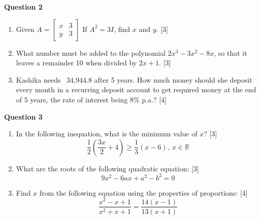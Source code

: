 \newpage
\noindent
\textbf{Question 2}\\
\begin{enumerate}[label=(\roman*)]

    \item Given $A = \begin{bmatrix*}  x & 3  \\  y & 3  \end{bmatrix*}$ 
        If $A^2 = 3I$, find $x$ and $y$. \hfill [3]

    \item What number must be added to the polynomial 
        $2x^3 - 3x^2 -8x$, so that it leaves a remainder 10 when 
        divided by $2x+1$. \hfill [3]

    \item Kashika needs \rupee~34,944.8 after 5 years. How much money 
        should she deposit every month in a recurring deposit account 
        to get required money at the end of 5 years, the rate of interest 
        being 8\% p.a.? \hfill [4]

\end{enumerate}

\par
\noindent
\textbf{Question 3}\\
\begin{enumerate}[label=(\roman*)]

    \item In the following inequation, what is the minimum value of $x$? \hfill [3]
        \[
            \frac12 \left(\frac{3x}{2}+4\right) \ge \frac13(x-6), \ x \in \mathbb{R}
        \]

    \item What are the roots of the following quadratic equation: \hfill [3]
        \[
            9x^2 - 6ax + a^2 - b^2 = 0 
        \]

    \item Find $x$ from the following equation using the properties of proportions: \hfill [4]
        \[
            \frac{x^2 - x + 1}{x^2 + x + 1} = \frac{14(x-1)}{13(x+1)}
        \]

\end{enumerate}

